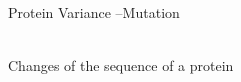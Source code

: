 \documentclass{nature}
\begin{document}
\begin{enumerate}
    {\bf \item Protein Variance --Mutation}\\
    Changes of the sequence of a protein
     
\end{enumerate}















\end{document}
